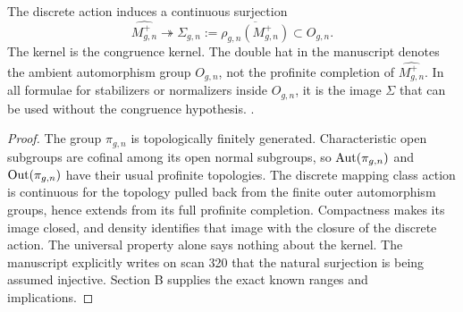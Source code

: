 The discrete action induces a continuous surjection
\[
\widehat{M^+_{g,n}}\twoheadrightarrow
\Sigma_{g,n}:=\overline{\rho_{g,n}(M^+_{g,n})}\subset O_{g,n}.
\]
The kernel is the congruence kernel. The double hat in the manuscript denotes the ambient automorphism group $O_{g,n}$, not the profinite completion of $\widehat{M^+_{g,n}}$. In all formulae for stabilizers or normalizers inside $O_{g,n}$, it is the image $\Sigma$ that can be used without the congruence hypothesis.
.
\begin{proof}
The group $\pi_{g,n}$ is topologically finitely generated. Characteristic open subgroups are cofinal among its open normal subgroups, so $\operatorname{Aut}(\pi_{g,n})$ and $\operatorname{Out}(\pi_{g,n})$ have their usual profinite topologies. The discrete mapping class action is continuous for the topology pulled back from the finite outer automorphism groups, hence extends from its full profinite completion. Compactness makes its image closed, and density identifies that image with the closure of the discrete action. The universal property alone says nothing about the kernel. The manuscript explicitly writes on scan 320 that the natural surjection is being assumed injective. Section B supplies the exact known ranges and implications.
\end{proof}

